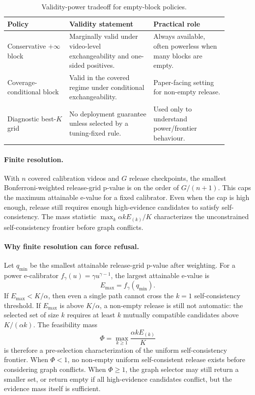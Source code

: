 \documentclass[11pt]{article}
\begin{document}
\begin{table}[h]
\centering
\caption{Validity-power tradeoff for empty-block policies.}
\small
\begin{tabular}{p{0.25\linewidth}p{0.34\linewidth}p{0.30\linewidth}}
\toprule
Policy & Validity statement & Practical role \\
\midrule
Conservative \(+\infty\) block & Marginally valid under video-level exchangeability and one-sided positives. & Always available, often powerless when many blocks are empty. \\
Coverage-conditional block & Valid in the covered regime under conditional exchangeability. & Paper-facing setting for non-empty release. \\
Diagnostic best-\(K\) grid & No deployment guarantee unless selected by a tuning-fixed rule. & Used only to understand power/frontier behaviour. \\
\bottomrule
\end{tabular}
\end{table}

\paragraph{Finite resolution.}
With \(n\) covered calibration videos and \(G\) release checkpoints, the smallest Bonferroni-weighted release-grid p-value is on the order of \(G/(n+1)\).
This caps the maximum attainable e-value for a fixed calibrator.
Even when the cap is high enough, release still requires enough high-evidence candidates to satisfy self-consistency.
The mass statistic \(\max_k \alpha k E_{(k)}/K\) characterizes the unconstrained self-consistency frontier before graph conflicts.

\paragraph{Why finite resolution can force refusal.}
Let \(q_{\min}\) be the smallest attainable release-grid p-value after weighting.
For a power e-calibrator \(f_\gamma(u)=\gamma u^{\gamma-1}\), the largest attainable e-value is
\[
E_{\max}=f_\gamma(q_{\min}).
\]
If \(E_{\max}<K/\alpha\), then even a single path cannot cross the \(k=1\) self-consistency threshold.
If \(E_{\max}\) is above \(K/\alpha\), a non-empty release is still not automatic: the selected set of size \(k\) requires at least \(k\) mutually compatible candidates above \(K/(\alpha k)\).
The feasibility mass
\[
\Phi=\max_{k\ge 1}\frac{\alpha k E_{(k)}}{K}
\]
is therefore a pre-selection characterization of the uniform self-consistency frontier.
When \(\Phi<1\), no non-empty uniform self-consistent release exists before considering graph conflicts.
When \(\Phi\ge1\), the graph selector may still return a smaller set, or return empty if all high-evidence candidates conflict, but the evidence mass itself is sufficient.
\end{document}
